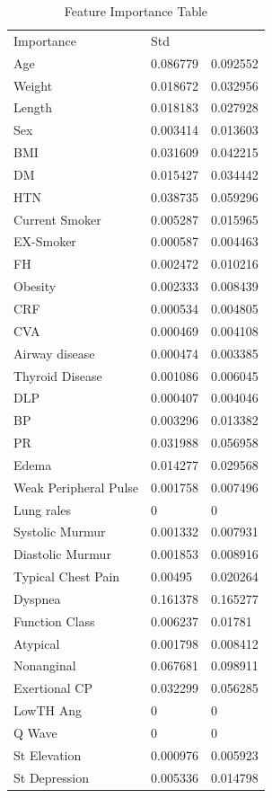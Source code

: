 \documentclass[sigconf]{acmart}
\begin{document}
\begin{table}[]
\centering
\caption{Feature Importance Table}
\label{my-label}
\begin{tabular}{lll}
Importance            & Std      &          \\
Age                   & 0.086779 & 0.092552 \\
Weight                & 0.018672 & 0.032956 \\
Length                & 0.018183 & 0.027928 \\
Sex                   & 0.003414 & 0.013603 \\
BMI                   & 0.031609 & 0.042215 \\
DM                    & 0.015427 & 0.034442 \\
HTN                   & 0.038735 & 0.059296 \\
Current Smoker        & 0.005287 & 0.015965 \\
EX-Smoker             & 0.000587 & 0.004463 \\
FH                    & 0.002472 & 0.010216 \\
Obesity               & 0.002333 & 0.008439 \\
CRF                   & 0.000534 & 0.004805 \\
CVA                   & 0.000469 & 0.004108 \\
Airway disease        & 0.000474 & 0.003385 \\
Thyroid Disease       & 0.001086 & 0.006045 \\
DLP                   & 0.000407 & 0.004046 \\
BP                    & 0.003296 & 0.013382 \\
PR                    & 0.031988 & 0.056958 \\
Edema                 & 0.014277 & 0.029568 \\
Weak Peripheral Pulse & 0.001758 & 0.007496 \\
Lung rales            & 0        & 0        \\
Systolic Murmur       & 0.001332 & 0.007931 \\
Diastolic Murmur      & 0.001853 & 0.008916 \\
Typical Chest Pain    & 0.00495  & 0.020264 \\
Dyspnea               & 0.161378 & 0.165277 \\
Function Class        & 0.006237 & 0.01781  \\
Atypical              & 0.001798 & 0.008412 \\
Nonanginal            & 0.067681 & 0.098911 \\
Exertional CP         & 0.032299 & 0.056285 \\
LowTH Ang             & 0        & 0        \\
Q Wave                & 0        & 0        \\
St Elevation          & 0.000976 & 0.005923 \\
St Depression         & 0.005336 & 0.014798
\end{tabular}
\end{table}
\end{document}
